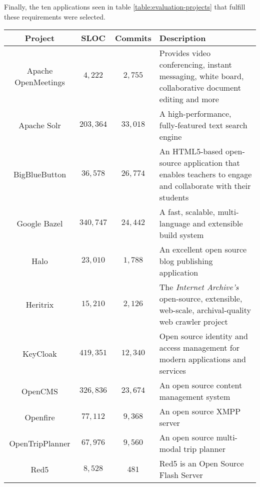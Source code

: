 \documentclass[12pt,a4paper]{report}
\begin{document}
Finally, the ten applications seen in table \ref{table:evaluation-projects}
that fulfill these requirements were selected.

\begin{table}[ht!]
\def\arraystretch{1.55}
\begin{tabularx}{\textwidth}{|c|c|c|X|}
\hline
Project & SLOC & Commits & Description \\
\hline\hline

Apache OpenMeetings & $4,222$   & $2,755$   &
Provides video conferencing, instant messaging, white board, collaborative document editing and more \\\hline

Apache Solr         & $203,364$ & $33,018$  &
A high-performance, fully\hyp featured text search engine \\\hline

BigBlueButton       & $36,578$  & $26,774$  &
An HTML5-based open-source application that enables teachers to engage and collaborate with their students \\\hline

Google Bazel        & $340,747$ & $24,442$  &
A fast, scalable, multi\hyp language and extensible build system \\\hline

Halo                & $23,010$  & $1,788$   &
An excellent open source blog publishing application \\\hline

Heritrix            & $15,210$  & $2,126$   &
The \textit{Internet Archive's} open\hyp source, extensible, web\hyp scale, archival\hyp quality web crawler project \\\hline

KeyCloak            & $419,351$ & $12,340$  &
Open source identity and access management for modern applications and services \\\hline

OpenCMS             & $326,836$ & $23,674$  &
An open source content management system \\\hline

Openfire            & $77,112$  & $9,368$   &
An open source XMPP server \\\hline

OpenTripPlanner     & $67,976$  & $9,560$   &
An open source multi\hyp modal trip planner \\\hline

Red5                & $8,528$   & $481$     &
Red5 is an Open Source Flash Server \\\hline


\end{tabularx}
\end{table}
\end{document}
